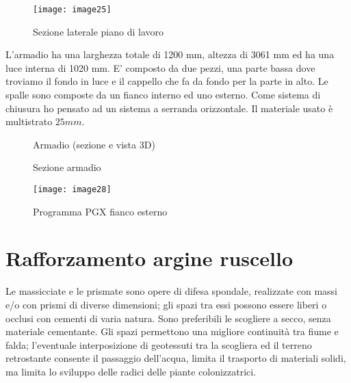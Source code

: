 \begin{figure}[H]
	\centering
	\texttt{[image: image25]}
	\caption{Sezione laterale piano di lavoro}
	\label{fig:mesh1}
\end{figure}

L’armadio ha una larghezza totale di 1200 mm, altezza di 3061 mm ed ha  una luce interna di 1020 mm. E’ composto da  due pezzi, una parte bassa dove troviamo il fondo in luce e il cappello che fa da fondo per la parte in alto. 
Le spalle sono composte da un fianco interno ed uno esterno. 
Come sistema di chiusura ho pensato ad un sistema a serranda orizzontale. 
Il materiale usato è multistrato  $25mm$.

\begin{figure}[H]
	\captionsetup[subfloat]{farskip=2pt,captionskip=8pt}
	\centering
	\hspace{1cm}
	
	\caption{Armadio (sezione e vista 3D)}
	\label{fig:imagesizes}
\end{figure}

\begin{figure}[H]
	\captionsetup[subfloat]{farskip=2pt,captionskip=8pt}
	\centering
	\hspace{1cm}
	
	\caption{Sezione armadio}
	\label{fig:imagesizes}
\end{figure}


\begin{figure}[H]
	\centering
	\texttt{[image: image28]}
	\caption{Programma PGX fianco esterno}
	\label{fig:mesh1}
\end{figure}


\section{Rafforzamento argine ruscello}

Le massicciate e le prismate sono opere di difesa spondale, realizzate con massi e/o con prismi di diverse dimensioni; gli spazi tra essi possono essere liberi o occlusi con cementi di varia natura. 
Sono preferibili le scogliere a secco, senza materiale cementante. Gli spazi permettono una migliore continuità tra fiume e falda; l’eventuale interposizione di geotessuti tra la scogliera ed il terreno retrostante consente il passaggio dell'acqua, limita il trasporto di materiali solidi, ma limita lo sviluppo delle radici delle piante colonizzatrici. 


